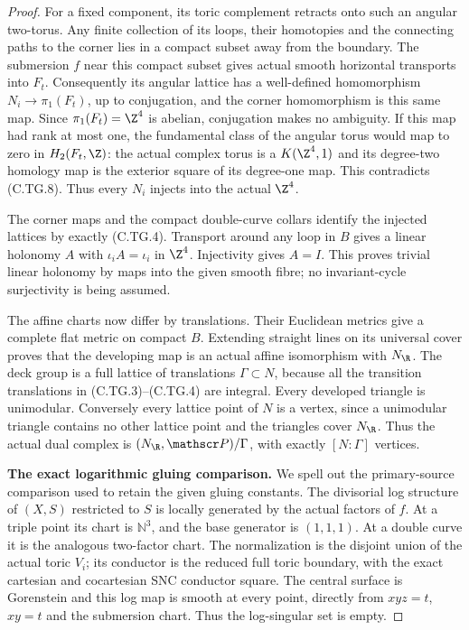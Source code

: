 \begin{proof}
For a fixed component, its toric complement retracts
onto such an angular two-torus. Any finite collection
of its loops, their homotopies and the connecting
paths to the corner lies in a compact subset away
from the boundary. The submersion $f$ near this
compact subset gives actual smooth horizontal
transports into $F_t$. Consequently its angular
lattice has a well-defined homomorphism
$N_i\to\pi_1(F_t)$, up to conjugation, and the
corner homomorphism is this same map. Since
$\pi_1(F_t)=\Z^4$ is abelian, conjugation makes
no ambiguity. If this map had rank at most one,
the fundamental class of the angular torus would
map to zero in $H_2(F_t,\Z)$: the actual complex
torus is a $K(\Z^4,1)$ and its degree-two homology
map is the exterior square of its degree-one map.
This contradicts (C.TG.8). Thus every $N_i$
injects into the actual $\Z^4$.

The corner maps and the compact double-curve collars
identify the injected lattices by exactly (C.TG.4).
Transport around any loop in $B$ gives a linear
holonomy $A$ with $\iota_iA=\iota_i$ in $\Z^4$.
Injectivity gives $A=I$. This proves trivial linear
holonomy by maps into the given smooth fibre; no
invariant-cycle surjectivity is being assumed.

The affine charts now differ by translations.
Their Euclidean metrics give a complete flat metric
on compact $B$. Extending straight lines on its
universal cover proves that the developing map is
an actual affine isomorphism with $N_{\R}$.
The deck group is a full lattice of translations
$\Gamma\subset N$, because all the transition
translations in (C.TG.3)--(C.TG.4) are integral.
Every developed triangle is unimodular. Conversely
every lattice point of $N$ is a vertex, since a
unimodular triangle contains no other lattice point
and the triangles cover $N_{\R}$. Thus the actual
dual complex is $(N_{\R},\mathscr P)/\Gamma$,
with exactly $[N:\Gamma]$ vertices.

\par\medskip\noindent\textbf{The exact logarithmic gluing comparison.}
We spell out the primary-source comparison used to
retain the given gluing constants. The divisorial
log structure of $(X,S)$ restricted to $S$ is locally
generated by the actual factors of $f$. At a triple
point its chart is $\mathbb N^3$, and the base generator
is $(1,1,1)$. At a double curve it is the analogous
two-factor chart. The normalization is the disjoint
union of the actual toric $V_i$; its conductor is
the reduced full toric boundary, with the exact
cartesian and cocartesian SNC conductor square.
The central surface is Gorenstein and this log
map is smooth at every point, directly from
$xyz=t$, $xy=t$ and the submersion chart. Thus
the log-singular set is empty.


\end{proof}
